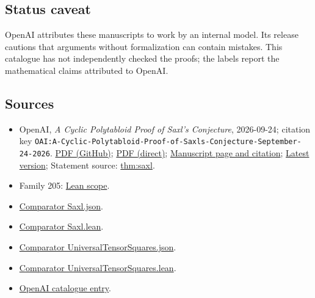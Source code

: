 \documentclass[11pt]{article}
\begin{document}
\subsection{Status caveat}
OpenAI attributes these manuscripts to work by an internal model. Its release cautions that arguments without formalization can contain mistakes. This catalogue has not independently checked the proofs; the labels report the mathematical claims attributed to OpenAI.

\subsection{Sources}
\begin{itemize}
\item OpenAI, \emph{A Cyclic Polytabloid Proof of Saxl's Conjecture}, 2026-09-24; citation key \texttt{OAI:A-Cyclic-Polytabloid-Proof-of-Saxls-Conjecture-September-24-2026}. \href{https://github.com/openai/math/blob/adc7f1241b42e322a6451854ab7e4b4c146bf78a/preprints/A-Cyclic-Polytabloid-Proof-of-Saxls-Conjecture-September-24-2026/paper.pdf}{PDF (GitHub)}; \href{https://github.com/openai/math/raw/adc7f1241b42e322a6451854ab7e4b4c146bf78a/preprints/A-Cyclic-Polytabloid-Proof-of-Saxls-Conjecture-September-24-2026/paper.pdf}{PDF (direct)}; \href{https://github.com/openai/math/blob/adc7f1241b42e322a6451854ab7e4b4c146bf78a/preprints/A-Cyclic-Polytabloid-Proof-of-Saxls-Conjecture-September-24-2026/README.md}{Manuscript page and citation}; \href{https://github.com/openai/math/blob/main/preprints/A-Cyclic-Polytabloid-Proof-of-Saxls-Conjecture-September-24-2026/paper.pdf}{Latest version}; Statement source: \href{https://github.com/openai/math/blob/adc7f1241b42e322a6451854ab7e4b4c146bf78a/preprints/A-Cyclic-Polytabloid-Proof-of-Saxls-Conjecture-September-24-2026/build/sections/introduction.tex\#L18}{thm:saxl}.
\item Family 205: \href{https://github.com/openai/math/blob/adc7f1241b42e322a6451854ab7e4b4c146bf78a/lean/docs/205.md}{Lean scope}.
\item \href{https://github.com/openai/math/blob/adc7f1241b42e322a6451854ab7e4b4c146bf78a/lean/ComparatorChallenges/Saxl.json}{Comparator Saxl.json}.
\item \href{https://github.com/openai/math/blob/adc7f1241b42e322a6451854ab7e4b4c146bf78a/lean/ComparatorChallenges/Saxl.lean}{Comparator Saxl.lean}.
\item \href{https://github.com/openai/math/blob/adc7f1241b42e322a6451854ab7e4b4c146bf78a/lean/ComparatorChallenges/UniversalTensorSquares.json}{Comparator UniversalTensorSquares.json}.
\item \href{https://github.com/openai/math/blob/adc7f1241b42e322a6451854ab7e4b4c146bf78a/lean/ComparatorChallenges/UniversalTensorSquares.lean}{Comparator UniversalTensorSquares.lean}.
\item \href{https://github.com/openai/math/blob/adc7f1241b42e322a6451854ab7e4b4c146bf78a/CONTENTS.md}{OpenAI catalogue entry}.
\end{itemize}
\end{document}
